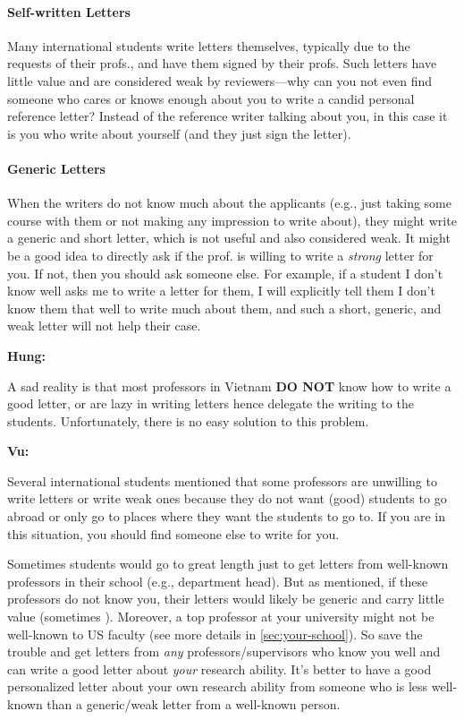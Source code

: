 \documentclass[oneside,11pt,dvipsnames]{book}
\newenvironment{commentbox}[1][]{
  \small
  \begin{mybox}
    {\small \textbf{#1}}
  }{
  \end{mybox}
}
\newcommand{\red}[1]{{\color{red}{#1}}}
\begin{document}
\paragraph{Self-written Letters} Many international students write letters themselves, typically due to the requests of their profs., and have them signed by their profs. Such letters have little value and are considered weak by reviewers---why can you not even find someone who cares or knows enough about you to write a candid personal reference letter?  Instead of the reference writer talking about you, in this case it is you who write about yourself (and they just sign the letter).

\paragraph{Generic Letters} When the writers do not know much about the applicants (e.g., just taking some course with them or not making any impression to write about), they might write a generic and short letter, which is not useful and also considered weak.  It might be a good idea to directly ask if the prof. is willing to write a \emph{strong} letter for you. If not, then you should ask someone else.  For example, if a student I don't know well asks me to write a letter for them, I will explicitly tell them I don't know them that well to write much about them, and such a short, generic, and weak letter will not help their case.

\begin{commentbox}[Hung:]
  A sad reality is that most professors in Vietnam \textbf{DO NOT} know how to write a good letter, or are lazy in writing letters hence delegate the writing to the students. Unfortunately, there is no easy solution to this problem.
\end{commentbox}

\begin{commentbox}[Vu:]

  Several international students mentioned that some professors are unwilling to write letters or write weak ones because they do not want (good) students to go abroad or only go to places where they want the students to go to. If you are in this situation, you should find someone else to write for you.
  \tcblower

Sometimes students would go to great length just to get letters from well-known professors in their school (e.g., department head). But as mentioned, if these professors do not know you, their letters would likely be generic and carry little value (sometimes \red{red flags}). Moreover, a top professor at your university might not be well-known to US faculty (see more details in \autoref{sec:your-school}). So save the trouble and get letters from \emph{any} professors/supervisors who know you well and can write a good letter about \emph{your} research ability. It's better to have a good personalized letter about your own research ability from someone who is less well-known than a generic/weak letter from a well-known person.

\end{commentbox}
\end{document}
